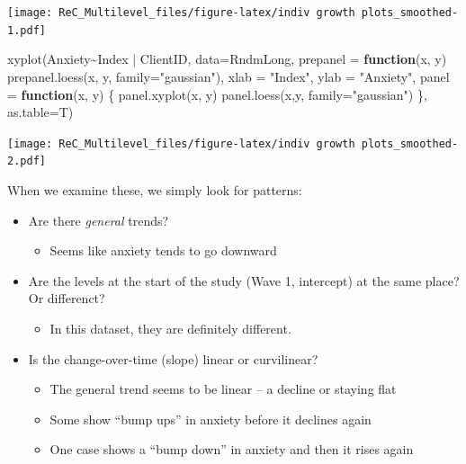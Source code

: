 \documentclass[
  english,
]{book}
\newenvironment{Shaded}{\begin{snugshade}}{\end{snugshade}}
\newcommand{\AttributeTok}[1]{\textcolor[rgb]{0.77,0.63,0.00}{#1}}
\newcommand{\ControlFlowTok}[1]{\textcolor[rgb]{0.13,0.29,0.53}{\textbf{#1}}}
\newcommand{\FunctionTok}[1]{\textcolor[rgb]{0.00,0.00,0.00}{#1}}
\newcommand{\NormalTok}[1]{#1}
\newcommand{\SpecialCharTok}[1]{\textcolor[rgb]{0.00,0.00,0.00}{#1}}
\newcommand{\StringTok}[1]{\textcolor[rgb]{0.31,0.60,0.02}{#1}}
\providecommand{\tightlist}{%
  \setlength{\itemsep}{0pt}\setlength{\parskip}{0pt}}
\begin{document}
\texttt{[image: ReC\_Multilevel\_files/figure-latex/indiv growth plots\_smoothed-1.pdf]}

\begin{Shaded}
\begin{Highlighting}[]
\FunctionTok{xyplot}\NormalTok{(Anxiety}\SpecialCharTok{\textasciitilde{}}\NormalTok{Index }\SpecialCharTok{|}\NormalTok{ ClientID, }\AttributeTok{data=}\NormalTok{RndmLong,}
  \AttributeTok{prepanel =} \ControlFlowTok{function}\NormalTok{(x, y) }\FunctionTok{prepanel.loess}\NormalTok{(x, y, }\AttributeTok{family=}\StringTok{"gaussian"}\NormalTok{),}
  \AttributeTok{xlab =} \StringTok{"Index"}\NormalTok{, }\AttributeTok{ylab =} \StringTok{"Anxiety"}\NormalTok{,}
  \AttributeTok{panel =} \ControlFlowTok{function}\NormalTok{(x, y) \{}
  \FunctionTok{panel.xyplot}\NormalTok{(x, y)}
  \FunctionTok{panel.loess}\NormalTok{(x,y, }\AttributeTok{family=}\StringTok{"gaussian"}\NormalTok{) \},}
   \AttributeTok{as.table=}\NormalTok{T)}
\end{Highlighting}
\end{Shaded}

\texttt{[image: ReC\_Multilevel\_files/figure-latex/indiv growth plots\_smoothed-2.pdf]}

When we examine these, we simply look for patterns:

\begin{itemize}
\tightlist
\item
  Are there \emph{general} trends?

  \begin{itemize}
  \tightlist
  \item
    Seems like anxiety tends to go downward
  \end{itemize}
\item
  Are the levels at the start of the study (Wave 1, intercept) at the same place? Or differenct?

  \begin{itemize}
  \tightlist
  \item
    In this dataset, they are definitely different.
  \end{itemize}
\item
  Is the change-over-time (slope) linear or curvilinear?

  \begin{itemize}
  \tightlist
  \item
    The general trend seems to be linear -- a decline or staying flat
  \item
    Some show ``bump ups'' in anxiety before it declines again
  \item
    One case shows a ``bump down'' in anxiety and then it rises again
  \end{itemize}
\end{itemize}
\end{document}
